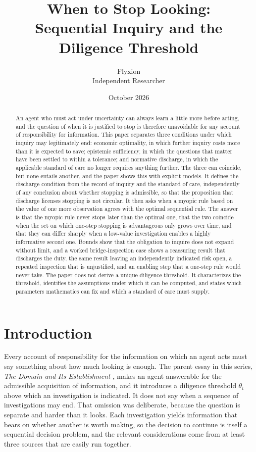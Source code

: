 \documentclass[11pt]{article}
\title{When to Stop Looking:\\Sequential Inquiry and the Diligence Threshold}
\author{Flyxion\\Independent Researcher}
\date{October 2026}
\theoremstyle{plain}
\theoremstyle{definition}
\begin{document}
\maketitle

\begin{abstract}
\noindent An agent who must act under uncertainty can always learn a little more before acting, and the question of when it is justified to stop is therefore unavoidable for any account of responsibility for information. This paper separates three conditions under which inquiry may legitimately end: economic optimality, in which further inquiry costs more than it is expected to save; epistemic sufficiency, in which the questions that matter have been settled to within a tolerance; and normative discharge, in which the applicable standard of care no longer requires anything further. The three can coincide, but none entails another, and the paper shows this with explicit models. It defines the discharge condition from the record of inquiry and the standard of care, independently of any conclusion about whether stopping is admissible, so that the proposition that discharge licenses stopping is not circular. It then asks when a myopic rule based on the value of one more observation agrees with the optimal sequential rule. The answer is that the myopic rule never stops later than the optimal one, that the two coincide when the set on which one-step stopping is advantageous only grows over time, and that they can differ sharply when a low-value investigation enables a highly informative second one. Bounds show that the obligation to inquire does not expand without limit, and a worked bridge-inspection case shows a reassuring result that discharges the duty, the same result leaving an independently indicated risk open, a repeated inspection that is unjustified, and an enabling step that a one-step rule would never take. The paper does not derive a unique diligence threshold. It characterizes the threshold, identifies the assumptions under which it can be computed, and states which parameters mathematics can fix and which a standard of care must supply.
\end{abstract}

\section{Introduction}\label{sec:intro}

Every account of responsibility for the information on which an agent acts must say something about how much looking is enough. The parent essay in this series, \emph{The Domain and Its Establishment} \cite{flyxion2026domain}, makes an agent answerable for the admissible acquisition of information, and it introduces a diligence threshold $\theta_t$ above which an investigation is indicated. It does not say when a sequence of investigations may end. That omission was deliberate, because the question is separate and harder than it looks. Each investigation yields information that bears on whether another is worth making, so the decision to continue is itself a sequential decision problem, and the relevant considerations come from at least three sources that are easily run together.
\end{document}
